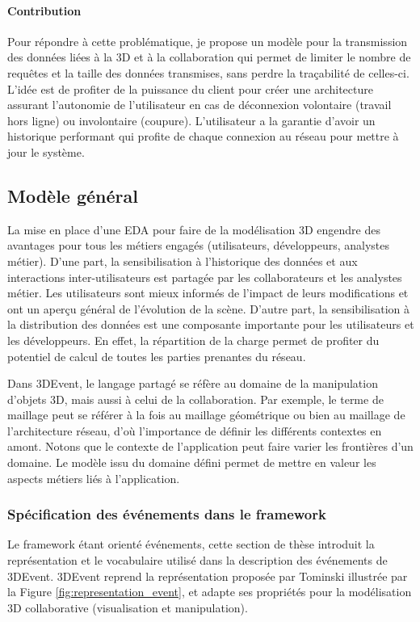 \paragraph{Contribution}
Pour répondre à cette problématique, je propose un modèle pour la 
transmission des données liées à la \gls{3D} et à la collaboration qui permet de  limiter  le 
nombre 
de requêtes et la taille des données transmises, sans perdre la traçabilité de 
celles-ci. L'idée est de profiter de la puissance du client pour créer une 
architecture assurant l'autonomie de l'utilisateur en cas de déconnexion volontaire 
(travail hors ligne) ou involontaire (coupure). L'utilisateur a la garantie d'avoir 
un historique performant qui profite de chaque connexion au réseau  pour mettre à jour le système.


\subsection{Modèle général}
La mise en place d'une \gls{EDA} pour faire de la modélisation \gls{3D} engendre des 
avantages pour tous les métiers engagés (utilisateurs, développeurs, analystes métier).
D'une part, la sensibilisation à l'historique des 
données et aux interactions 
inter-utilisateurs est partagée par les collaborateurs et les analystes métier. Les utilisateurs sont mieux informés de l'impact de leurs modifications et ont un aperçu général de l'évolution de la scène. D'autre part, 
la sensibilisation à la distribution des données est une composante 
importante pour les utilisateurs et les développeurs. En effet, la répartition 
de la charge permet de profiter du potentiel de calcul de toutes les parties 
prenantes du réseau. 

Dans 3DEvent, le langage partagé se réfère au domaine de la manipulation 
d'objets \gls{3D}, mais aussi à celui de la collaboration. Par exemple, le terme 
de 
maillage peut se référer à la fois au maillage géométrique ou bien au maillage de 
l'architecture réseau, d'où l'importance de définir les différents contextes en amont. 
Notons que le contexte de l'application peut faire varier les frontières d'un 
domaine. Le modèle issu du domaine défini permet de mettre en valeur les 
aspects métiers liés à l'application.

\subsubsection{Spécification des événements dans le framework}
Le framework étant orienté événements, cette section de thèse introduit la 
représentation et 
le vocabulaire utilisé dans la description des événements de 3DEvent. 3DEvent 
reprend la représentation proposée par Tominski \cite{Doktor-ingenieur2006} 
illustrée par la Figure \ref{fig:representation_event}, et adapte ses propriétés pour 
la modélisation \gls{3D} collaborative (visualisation et manipulation). 

